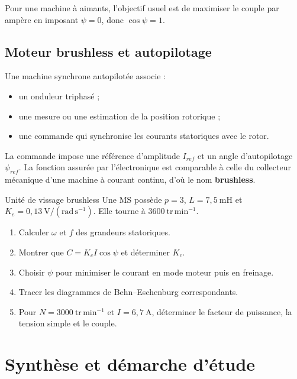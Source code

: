 Pour une machine à aimants, l'objectif usuel est de maximiser le couple par ampère en imposant $\psi=0$, donc $\cos\psi=1$.

\subsection{Moteur brushless et autopilotage}

Une machine synchrone autopilotée associe :
\begin{itemize}
  \item un onduleur triphasé ;
  \item une mesure ou une estimation de la position rotorique ;
  \item une commande qui synchronise les courants statoriques avec le rotor.
\end{itemize}

\begin{center}\TLChaineBrushless\end{center}

La commande impose une référence d'amplitude $I_{ref}$ et un angle d'autopilotage $\psi_{ref}$. La fonction assurée par l'électronique est comparable à celle du collecteur mécanique d'une machine à courant continu, d'où le nom \textbf{brushless}.

\begin{TLMachineExercise}{Unité de vissage brushless}
Une MS possède $p=3$, $L=7{,}5\ \mathrm{mH}$ et $K_e=0{,}13\ \mathrm{V/(rad\,s^{-1})}$. Elle tourne à $3600\ \mathrm{tr\,min^{-1}}$.
\begin{enumerate}
  \item Calculer $\omega$ et $f$ des grandeurs statoriques.
  \item Montrer que $C=K_cI\cos\psi$ et déterminer $K_c$.
  \item Choisir $\psi$ pour minimiser le courant en mode moteur puis en freinage.
  \item Tracer les diagrammes de Behn--Eschenburg correspondants.
  \item Pour $N=3000\ \mathrm{tr\,min^{-1}}$ et $I=6{,}7\ \mathrm A$, déterminer le facteur de puissance, la tension simple et le couple.
\end{enumerate}
\end{TLMachineExercise}

\section{Synthèse et démarche d'étude}
\label{sec:masms-6}


